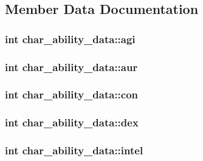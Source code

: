 \subsection{Member Data Documentation}
\hypertarget{structchar__ability__data_a42ade1d78f01ef212d6e652c60a0b9a8}{
\subsubsection[{agi}]{\setlength{\rightskip}{0pt plus 5cm}int char\-\_\-ability\-\_\-data\-::agi}}\label{structchar__ability__data_a42ade1d78f01ef212d6e652c60a0b9a8}
\hypertarget{structchar__ability__data_aef296557583ee057d7c2a80c1e005319}{
\subsubsection[{aur}]{\setlength{\rightskip}{0pt plus 5cm}int char\-\_\-ability\-\_\-data\-::aur}}\label{structchar__ability__data_aef296557583ee057d7c2a80c1e005319}
\hypertarget{structchar__ability__data_a5b45e5f5def4987bdb429d9c9da41068}{
\subsubsection[{con}]{\setlength{\rightskip}{0pt plus 5cm}int char\-\_\-ability\-\_\-data\-::con}}\label{structchar__ability__data_a5b45e5f5def4987bdb429d9c9da41068}
\hypertarget{structchar__ability__data_aa31c8cb270329610e5b8ccd5007b1836}{
\subsubsection[{dex}]{\setlength{\rightskip}{0pt plus 5cm}int char\-\_\-ability\-\_\-data\-::dex}}\label{structchar__ability__data_aa31c8cb270329610e5b8ccd5007b1836}
\hypertarget{structchar__ability__data_af63e4fce63b64c461c265e2017bfd54c}{
\subsubsection[{intel}]{\setlength{\rightskip}{0pt plus 5cm}int char\-\_\-ability\-\_\-data\-::intel}}\label{structchar__ability__data_af63e4fce63b64c461c265e2017bfd54c}
